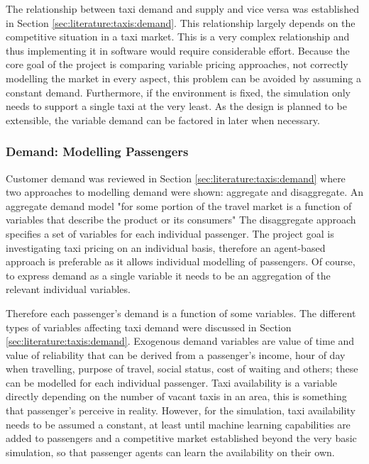 The relationship between taxi demand and supply and vice versa was established
in Section \ref{sec:literature:taxis:demand}. This relationship largely depends
on the competitive situation in a taxi market. This is a very complex
relationship and thus implementing it in software would require considerable
effort. Because the core goal of the project is comparing variable pricing
approaches, not correctly modelling the market in every aspect, this problem
can be avoided by assuming a constant demand. Furthermore, if the environment
is fixed, the simulation only needs to support a single taxi at the very least.
As the design is planned to be extensible, the variable demand can be factored
in later when necessary.


\subsubsection{Demand: Modelling Passengers}
\label{sec:requirements:passenger}

Customer demand was reviewed in Section \ref{sec:literature:taxis:demand} where
two approaches to modelling demand were shown: aggregate and disaggregate. An
aggregate demand model "for some portion of the travel market is a function of
variables that describe the product or its consumers"
\parencite{Small2007taxi+urban} The disaggregate approach specifies a set of
variables for each individual passenger. The project goal is investigating taxi
pricing on an individual basis, therefore an agent-based approach is
preferable as it allows individual modelling of passengers. Of course, to
express demand as a single variable it needs to be an aggregation of the
relevant individual variables.

Therefore each passenger's demand is a function of some variables. The
different types of variables affecting taxi demand were discussed in Section
\ref{sec:literature:taxis:demand}. Exogenous demand variables are value of time
and value of reliability that can be derived from a passenger's income, hour of
day when travelling, purpose of travel, social status, cost of waiting and
others; these can be modelled for each individual passenger. Taxi availability
is a variable directly depending on the number of vacant taxis in an area, this
is something that passenger's perceive in reality. However, for the simulation,
taxi availability needs to be assumed a constant, at least until machine
learning capabilities are added to passengers and a competitive market
established beyond the very basic simulation, so that passenger agents can
learn the availability on their own.

